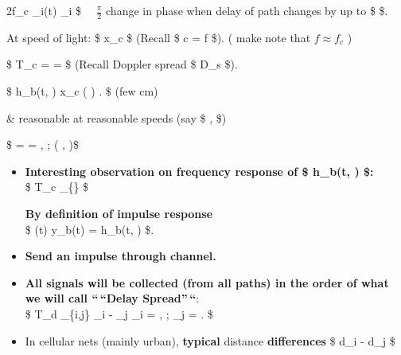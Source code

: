\documentclass[11pt]{article}
\providecommand{\tightlist}{%
      \setlength{\itemsep}{0pt}\setlength{\parskip}{0pt}}
\begin{document}
{2\pi f\_c \tau\_i(t) \approx {} \implies \tau\_i
\approx {} \$ \(\quad \frac{\pi}{2}\) change in phase when
delay of path changes by up to \$ \approx {} \$.

At speed of light: \$ \Delta x\_c \approx {} \Rightarrow
\$ (Recall \$ c = \lambda \cdot f \$). ( make note that
\(f \approx f_c\) )

\$ \Rightarrow T\_c =  = 
\approx {} \approx {} \$ (Recall
Doppler spread \$ D\_s \approx {} \$).

    \$ \Rightarrow h\_b(t, \tau)  \Delta x\_c
\approx {} \qquad \left( 
\approx {} \qquad {} \approx {}
 \right) 
. \$ (few cm)

\& reasonable at reasonable speeds (say \$  ,  \$)

\$ 
\approx {}
=  =
   ,  ; ( ,
)\$

\begin{itemize}
\item
  \textbf{Interesting observation on frequency response of \$ h\_b(t,
  \tau) \$:}\\
  \$ T\_c
  \gg {}\_\{\}
  \$

  \textbf{By definition of impulse response}\\
  \$ \delta(t) \to {} \to y\_b(t) = h\_b(t, \tau) \$.
\item
  \textbf{Send an impulse through channel.}
\item
  \textbf{All signals will be collected (from all paths) in the order of
  what we will call ``\,``Delay Spread''\,``}:\\
  \$ T\_d \overset{\Delta}{=} \max\limits\_\{i,j\} \textbar{}\tau\_i -
  \tau\_j\textbar{} \qquad \tau\_i =
  , ; \tau\_j =
  . \$
\end{itemize}

    \begin{itemize}
\tightlist
\item
  In cellular nets (mainly urban), \textbf{typical} distance
  \textbf{differences} \$ d\_i - d\_j \approx {}
  \$
\end{itemize}

}
\end{document}
